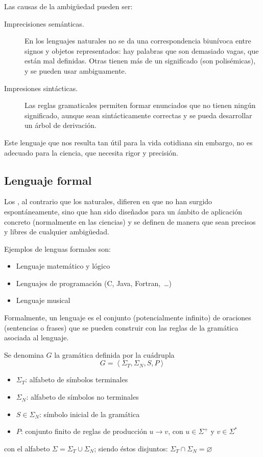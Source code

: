 Las causas de la ambigüedad pueden ser:
\nopagebreak
\begin{description}
\item[Imprecisiones semánticas.] En los lenguajes naturales no se da una correspondencia biunívoca entre signos y objetos representados: hay palabras que son demasiado vagas, que están mal definidas. Otras tienen más de un significado (son polisémicas), y se pueden usar ambiguamente.
\item[Impresiones sintácticas.] Las reglas gramaticales permiten formar enunciados que no tienen ningún significado, aunque sean sintácticamente correctas y se pueda desarrollar un árbol de derivación.
\end{description}

Este lenguaje que nos resulta tan útil para la vida cotidiana sin embargo, no es adecuado para la ciencia, que necesita rigor y precisión. \citep{DiazSantos2015}

\subsection{Lenguaje formal}

Los , al contrario que los naturales, difieren en que no han surgido espontáneamente, sino que han sido diseñados para un ámbito de aplicación concreto (normalmente en las ciencias) y se definen de manera que sean precisos y libres de cualquier ambigüedad.

Ejemplos de lenguas formales son:
\nopagebreak
\begin{itemize}
\item Lenguaje matemático y lógico
\item Lenguajes de programación (C, Java, Fortran,~\ldots)
\item Lenguaje musical
\end{itemize}

Formalmente, un lenguaje es el conjunto (potencialmente infinito) de oraciones (sentencias o frases) que se pueden construir con las reglas de la gramática asociada al lenguaje.

\begin{definition}
\citep{MorenoVelo2010}
Se denomina  $G$ la gramática definida por la cuádrupla
\[
G = \left< \Sigma_T, \Sigma_N, S, P \right>
\]
\begin{itemize}
\item $\Sigma_T$: alfabeto de símbolos terminales
\item $\Sigma_N$: alfabeto de símbolos no terminales
\item $S \in \Sigma_N$: símbolo inicial de la gramática
\item $P$: conjunto finito de reglas de producción $u \rightarrow v$, con $u \in \Sigma^+$ y $v \in \Sigma^*$
\end{itemize}
con el alfabeto $\Sigma = \Sigma_T \cup \Sigma_N$; siendo éstos disjuntos: $\Sigma_T \cap \Sigma_N = \varnothing$
\end{definition}

